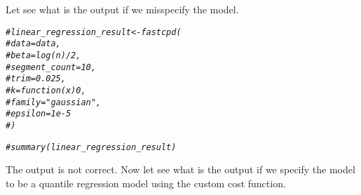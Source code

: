 \documentclass[article]{jss}\usepackage[]{graphicx}\usepackage[]{xcolor}
\makeatletter
\newcommand{\hlcom}[1]{\textcolor[rgb]{0.678,0.584,0.686}{\textit{#1}}}%
\newenvironment{kframe}{%
 \def\at@end@of@kframe{}%
 \ifinner\ifhmode%
  \def\at@end@of@kframe{\end{minipage}}%
  \begin{minipage}{\columnwidth}%
 \fi\fi%
 \def\FrameCommand##1{\hskip\@totalleftmargin \hskip-\fboxsep
 \colorbox{shadecolor}{##1}\hskip-\fboxsep
     \hskip-\linewidth \hskip-\@totalleftmargin \hskip\columnwidth}%
 \MakeFramed {\advance\hsize-\width
   \@totalleftmargin\z@ \linewidth\hsize
   \@setminipage}}%
 {\par\unskip\endMakeFramed%
 \at@end@of@kframe}
\newenvironment{knitrout}{}{} %
\makeatother
\begin{document}
Let see what is the output if we misspecify the model.
%
\begin{knitrout}
\color{fgcolor}\begin{kframe}
\begin{alltt}
\hlcom{# linear_regression_result <- fastcpd(}
\hlcom{#   data = data,}
\hlcom{#   beta = log(n) / 2,}
\hlcom{#   segment_count = 10,}
\hlcom{#   trim = 0.025,}
\hlcom{#   k = function(x) 0,}
\hlcom{#   family = "gaussian",}
\hlcom{#   epsilon = 1e-5}
\hlcom{# )}

\hlcom{# summary(linear_regression_result)}
\end{alltt}
\end{kframe}
\end{knitrout}
%
The output is not correct. Now let see what is the output if we specify the
model to be a quantile regression model using the custom cost function.
%
\end{document}
